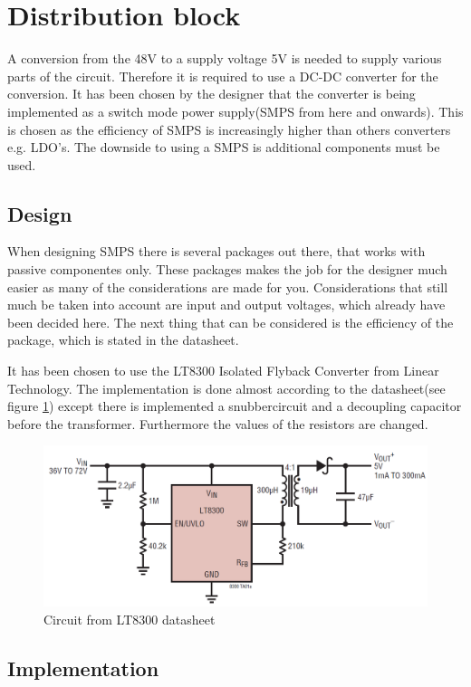 \section{Distribution block}
A conversion from the 48V to a supply voltage 5V is needed to supply various parts of the circuit. Therefore it is required to use a DC-DC converter for the conversion. It has been chosen by the designer that the converter is being implemented as a switch mode power supply(SMPS from here and onwards). This is chosen as the efficiency of SMPS is increasingly higher than others converters e.g. LDO's. The downside to using a SMPS is additional components must be used.  

\subsection{Design}

When designing SMPS there is several packages out there, that works with passive componentes only. These packages makes the job for the designer much easier as many of the considerations are made for you. Considerations that still much be taken into account are input and output voltages, which already have been decided here. The next thing that can be considered is the efficiency of the package, which is stated in the datasheet.

It has been chosen to use the LT8300 Isolated Flyback Converter from Linear Technology. The implementation is done almost according to the datasheet(see figure \ref{fig:LT8300})  except there is implemented a snubbercircuit and a decoupling capacitor before the transformer. Furthermore the values of the resistors are changed.  \\

\begin{figure}[H]
	\centering
	\includegraphics[width=0.6\linewidth]{Hardware/Pictures/LT8300_circuit}
	\caption{Circuit from LT8300 datasheet}
	\label{fig:LT8300}
\end{figure}

\subsection{Implementation}

